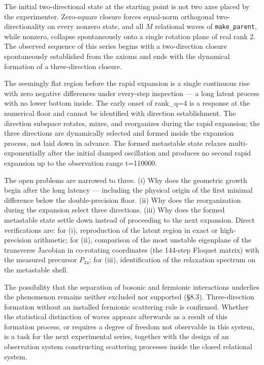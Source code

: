 \documentclass[
  a4paper,
]{article}
\begin{document}
The initial two-directional state at the starting point is not two axes
placed by the experimenter. Zero-square closure forces equal-norm
orthogonal two-directionality on every nonzero state, and all \(M\)
relational waves of \texttt{make\_parent}, while nonzero, collapse
spontaneously onto a single rotation plane of real rank 2. The observed
sequence of this series begins with a two-direction closure
spontaneously established from the axioms and ends with the dynamical
formation of a three-direction closure.

The seemingly flat region before the rapid expansion is a single
continuous rise with zero negative differences under every-step
inspection --- a long latent process with no lower bottom inside. The
early onset of rank\_q=4 is a response at the numerical floor and cannot
be identified with direction establishment. The direction subspace
rotates, mixes, and reorganizes during the rapid expansion; the three
directions are dynamically selected and formed inside the expansion
process, not laid down in advance. The formed metastable state relaxes
multi-exponentially after the initial damped oscillation and produces no
second rapid expansion up to the observation range t=110000.

The open problems are narrowed to three. (i) Why does the geometric
growth begin after the long latency --- including the physical origin of
the first minimal difference below the double-precision floor. (ii) Why
does the reorganization during the expansion select three directions.
(iii) Why does the formed metastable state settle down instead of
proceeding to the next expansion. Direct verifications are: for (i),
reproduction of the latent region in exact or high-precision arithmetic;
for (ii), comparison of the most unstable eigenplane of the transverse
Jacobian in co-rotating coordinates (the 144-step Floquet matrix) with
the measured precursor \(P_{34}\); for (iii), identification of the
relaxation spectrum on the metastable shell.

The possibility that the separation of bosonic and fermionic
interactions underlies the phenomenon remains neither excluded nor
supported (§8.3). Three-direction formation without an installed
fermionic scattering rule is confirmed. Whether the statistical
distinction of waves appears afterwards as a result of this formation
process, or requires a degree of freedom not observable in this system,
is a task for the next experimental series, together with the design of
an observation system constructing scattering processes inside the
closed relational system.
\end{document}
